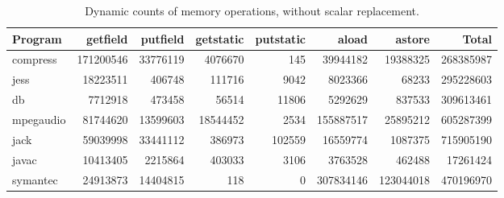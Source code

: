\begin{table}
\begin{center}
\begin{tabular}{||l|r|r|r|r|r|r||r||}			\hline
{\bf Program}				&
{\bf getfield}				&
{\bf putfield}				&
{\bf getstatic}				&
{\bf putstatic}				&
{\bf aload}				&
{\bf astore}				& 
{\bf Total} 			\\ \hline
%

compress & 171200546 & 33776119 & 4076670 & 145 & 39944182 & 19388325 & 268385987 \\
jess & 18223511 & 406748 & 111716 & 9042 & 8023366 & 68233 & 295228603 \\
db & 7712918 & 473458 & 56514 & 11806 & 5292629 & 837533 & 309613461 \\
mpegaudio & 81744620 & 13599603 & 18544452 & 2534 & 155887517 & 25895212 & 605287399 \\
jack & 59039998 & 33441112 & 386973 & 102559 & 16559774 & 1087375 & 715905190 \\
javac & 10413405 & 2215864 & 403033 & 3106 & 3763528 & 462488 & 17261424 \\
symantec & 24913873 & 14404815 & 118 & 0 & 307834146 & 123044018 & 470196970 \\ \hline

\end{tabular}
\end{center}
  \caption{Dynamic counts of memory operations, without scalar replacement.}
  \label{table:character}
\end{table}
